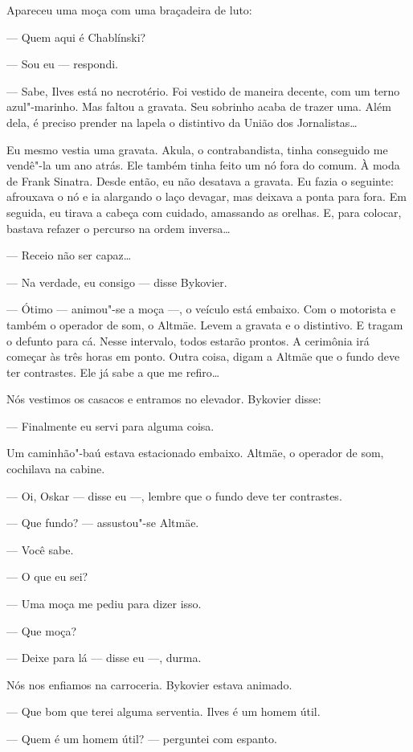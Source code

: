 Apareceu uma moça com uma braçadeira de luto:

--- Quem aqui é Chablínski?

--- Sou eu --- respondi.

--- Sabe, Ilves está no necrotério. Foi vestido de maneira decente, com
um terno azul"-marinho. Mas faltou a gravata. Seu sobrinho acaba de
trazer uma. Além dela, é preciso prender na lapela o distintivo da União
dos Jornalistas\ldots{}

Eu mesmo vestia uma gravata. Akula, o contrabandista, tinha conseguido
me vendê"-la um ano atrás. Ele também tinha feito um nó fora do comum. À
moda de Frank Sinatra. Desde então, eu não desatava a gravata. Eu fazia
o seguinte: afrouxava o nó e ia alargando o laço devagar, mas deixava a
ponta para fora. Em seguida, eu tirava a cabeça com cuidado, amassando
as orelhas. E, para colocar, bastava refazer o percurso na ordem
inversa\ldots{}

--- Receio não ser capaz\ldots{}

--- Na verdade, eu consigo --- disse Bykovier.

--- Ótimo --- animou"-se a moça ---, o veículo está embaixo. Com o
motorista e também o operador de som, o Altmäe. Levem a gravata e o
distintivo. E tragam o defunto para cá. Nesse intervalo, todos estarão
prontos. A cerimônia irá começar às três horas em ponto. Outra coisa,
digam a Altmäe que o fundo deve ter contrastes. Ele já sabe a que me
refiro\ldots{}

Nós vestimos os casacos e entramos no elevador. Bykovier disse:

--- Finalmente eu servi para alguma coisa.

Um caminhão"-baú estava estacionado embaixo. Altmäe, o
operador de som, cochilava na cabine.

--- Oi, Oskar --- disse eu ---, lembre que o fundo deve ter contrastes.

--- Que fundo? --- assustou"-se Altmäe.

--- Você sabe.

--- O que eu sei?

--- Uma moça me pediu para dizer isso.

--- Que moça?

--- Deixe para lá --- disse eu ---, durma.

Nós nos enfiamos na carroceria. Bykovier estava animado.

--- Que bom que terei alguma serventia. Ilves é um homem útil.

--- Quem é um homem útil? --- perguntei com espanto.

